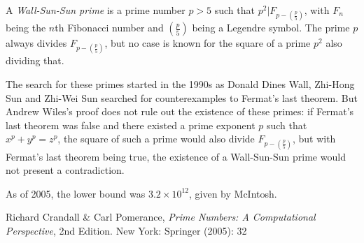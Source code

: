 \documentclass[12pt]{article}
\begin{document}
A {\em Wall-Sun-Sun prime} is a prime number $p > 5$ such that $p^2 | F_{p - \left(\frac{p}{5}\right)}$, with $F_n$ being the $n$th Fibonacci number and $\left(\frac{p}{5}\right)$ being a Legendre symbol. The prime $p$ always divides $F_{p - \left(\frac{p}{5}\right)}$, but no case is known for the square of a prime $p^2$ also dividing that.

The search for these primes started in the 1990s as Donald Dines Wall, Zhi-Hong Sun and Zhi-Wei Sun searched for counterexamples to Fermat's last theorem. But Andrew Wiles's proof does not rule out the existence of these primes: if Fermat's last theorem was false and there existed a prime exponent $p$ such that $x^p + y^p = z^p$, the square of such a prime would also divide $F_{p - \left(\frac{p}{5}\right)}$, but with Fermat's last theorem being true, the existence of a Wall-Sun-Sun prime would not present a contradiction.

As of 2005, the lower bound was $3.2 \times 10^{12}$, given by McIntosh.

\begin{thebibliography}{1}
 Richard Crandall \& Carl Pomerance, {\it Prime Numbers: A Computational Perspective}, 2nd Edition. New York: Springer (2005): 32
\end{thebibliography}

\end{document}
